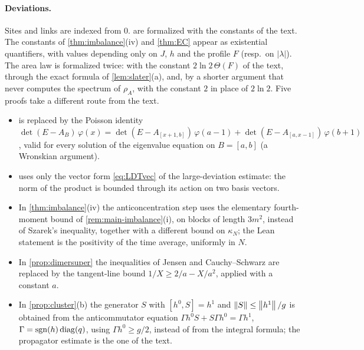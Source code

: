 \paragraph{Deviations.}  Sites and links are indexed from $0$.  
are formalized with the constants of the text.  The constants of \cref{thm:imbalance}(iv) and \cref{thm:EC} appear as
existential quantifiers, with values depending only on $J$, $h$ and the profile $F$ (resp.\ on $|\lambda|$).  The area law is
formalized twice: with the constant $2\ln2\,\Theta(F)$ of the text, through the exact formula of \cref{lem:slater}(a),
and, by a shorter argument that never computes the spectrum of $\rho_A$, with the constant $2$ in place of $2\ln2$.
Five proofs take a different route from
the text.
\begin{itemize}
\item {} is replaced by the Poisson identity
$\det(E-A_B)\,\varphi(x)=\det(E-A_{[x+1,b]})\,\varphi(a-1)+\det(E-A_{[a,x-1]})\,\varphi(b+1)$, valid
for every solution of the eigenvalue equation on $B=[a,b]$ (a Wronskian argument).
\item {} uses only the vector form \eqref{eq:LDTvec} of the large-deviation estimate:
the norm of the product is bounded through its action on two basis vectors.
\item In \cref{thm:imbalance}(iv) the anticoncentration step uses the elementary fourth-moment bound of
\cref{rem:main-imbalance}(i), on blocks of length $3m^2$, instead of Szarek's inequality, together with a different
bound on $\kappa_N$; the Lean statement is the positivity of the time average, uniformly in $N$.
\item In \cref{prop:dimersuper} the inequalities of Jensen and Cauchy--Schwarz are replaced by the tangent-line bound
$1/X\ge2/a-X/a^2$, applied with a constant $a$.
\item In \cref{prop:cluster}(b) the generator $S$ with $[h^0,S]=h^1$ and $\left\|S\right\|\le\left\|h^1\right\|/g$ is obtained
from the anticommutator equation $\Gamma h^0S+S\Gamma h^0=\Gamma h^1$, $\Gamma=\operatorname{sgn}(h)\operatorname{diag}(q)$,
using $\Gamma h^0\ge g/2$, instead of from the integral formula; the propagator estimate is the one of the text.
\end{itemize}

